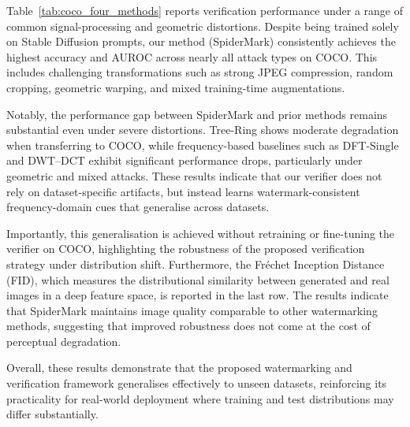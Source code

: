 \documentclass[lettersize,journal,review]{IEEEtran}
\begin{document}
Table~\ref{tab:coco_four_methods} reports verification performance under a range of common signal-processing and geometric distortions. Despite being trained solely on Stable Diffusion prompts, our method (SpiderMark) consistently achieves the highest accuracy and AUROC across nearly all attack types on COCO. This includes challenging transformations such as strong JPEG compression, random cropping, geometric warping, and mixed training-time augmentations.

Notably, the performance gap between SpiderMark and prior methods remains substantial even under severe distortions. Tree-Ring shows moderate degradation when transferring to COCO, while frequency-based baselines such as DFT-Single and DWT--DCT exhibit significant performance drops, particularly under geometric and mixed attacks. These results indicate that our verifier does not rely on dataset-specific artifacts, but instead learns watermark-consistent frequency-domain cues that generalise across datasets.

Importantly, this generalisation is achieved without retraining or fine-tuning the verifier on COCO, highlighting the robustness of the proposed verification strategy under distribution shift. Furthermore, the Fréchet Inception Distance (FID), which measures the distributional similarity between generated and real images in a deep feature space, is reported in the last row. The results indicate that SpiderMark maintains image quality comparable to other watermarking methods, suggesting that improved robustness does not come at the cost of perceptual degradation.

Overall, these results demonstrate that the proposed watermarking and verification framework generalises effectively to unseen datasets, reinforcing its practicality for real-world deployment where training and test distributions may differ substantially.
\end{document}
